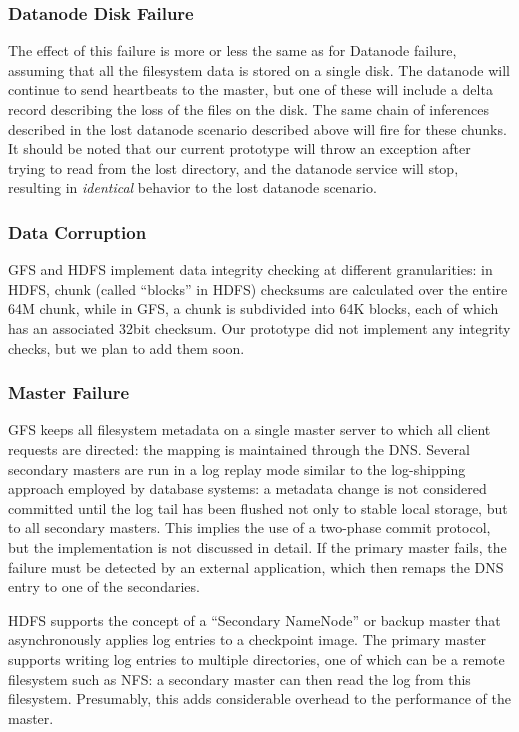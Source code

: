 \documentclass{article}
\begin{document}
\subsubsection{Datanode Disk Failure}
The effect of this failure is more or less the same as for Datanode failure, assuming that all the filesystem data is stored on a single disk.  The datanode will continue to send heartbeats to the master, but one of these will include a delta record describing the loss of the files on the disk.  The same chain of inferences described in the lost datanode scenario described above will fire for these chunks.  It should be noted that our current prototype will throw an exception after trying to read from the lost directory, and the datanode service will stop, resulting in \emph{identical} behavior to the lost datanode scenario.

\subsubsection{Data Corruption}
GFS and HDFS implement data integrity checking at different granularities: in HDFS, chunk (called ``blocks'' in HDFS) checksums are calculated over the entire 64M chunk, while in GFS, a chunk is subdivided into 64K blocks, each of which has an associated 32bit checksum.  Our prototype did not implement any integrity checks, but we plan to add them soon.

\subsubsection{Master Failure}
GFS keeps all filesystem metadata on a single master server to which all client requests are directed: the mapping is maintained through the DNS.  Several secondary masters are run in a log replay mode similar to the log-shipping approach employed by database systems: a metadata change is not considered committed until the log tail has been flushed not only to stable local storage, but to all secondary masters.  This implies the use of a two-phase commit protocol, but the implementation is not discussed in detail.  If the primary master fails, the failure must be detected by an external application, which then remaps the DNS entry to one of the secondaries.
 
HDFS supports the concept of a ``Secondary NameNode'' or backup master that asynchronously applies  log entries to a checkpoint image.  The primary master supports writing log entries to multiple directories, one of which can be a remote filesystem such as NFS: a secondary master can then read the log from this filesystem.  Presumably, this adds considerable overhead to the performance of the master.
 
\end{document}
